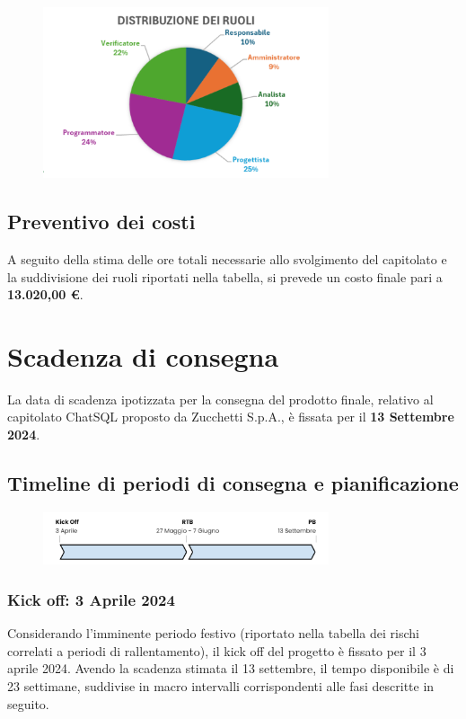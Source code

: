 \begin{figure}[H]
  \centering
  \includegraphics[width=0.75\textwidth]{assets/piechart.png}
\end{figure}

\subsection{Preventivo dei costi}
A seguito della stima delle ore totali necessarie allo svolgimento del capitolato e la suddivisione dei ruoli riportati nella tabella, si prevede un costo finale pari a \textbf{13.020,00 €}.

\section{Scadenza di consegna}
La data di scadenza ipotizzata per la consegna del prodotto finale, relativo al capitolato ChatSQL proposto da Zucchetti S.p.A., è fissata per il \textbf{13 Settembre 2024}.

\subsection{Timeline di periodi di consegna e pianificazione} \label{pianificazione}

\begin{figure}[H]
  \centering
  \includegraphics[width=0.75\textwidth]{assets/timelineperiodi.png}
\end{figure}

\subsubsection{Kick off: 3 Aprile 2024}
Considerando l’imminente periodo festivo (riportato nella tabella dei rischi correlati a periodi di rallentamento), il kick off del progetto è fissato per il 3 aprile 2024. Avendo la scadenza stimata il 13 settembre, il tempo disponibile è di 23 settimane, suddivise in macro intervalli corrispondenti alle fasi descritte in seguito.

